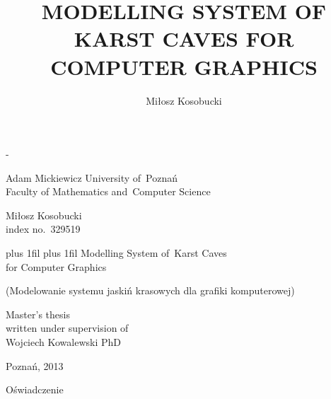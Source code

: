 \documentclass[twoside,openright,a4paper,12pt]{memoir}
\theoremstyle{definition}
\begin{document}
\title{MODELLING SYSTEM OF KARST CAVES FOR COMPUTER GRAPHICS}
\author{Miłosz Kosobucki}


\begin{titlingpage}
\calccentering{\unitlength}
\begin{adjustwidth*}{\unitlength}{-\unitlength}
\begin{center}
 \begin{LARGE}
   Adam Mickiewicz University of~Poznań\\
   Faculty of Mathematics and~Computer Science\\
   \vspace{2.5cm}
   \begin{huge}
     Miłosz Kosobucki\\
     \small{index no.~329519}\\
   \end{huge}
   \vspace{2.5cm}
   \begin{Huge}
     \leftskip=-3cm plus 1fil\rightskip=-3cm plus 1fil
     Modelling System of~Karst Caves\\ for Computer Graphics\\
   \end{Huge}
   \vspace{0.3cm}
   \begin{footnotesize}
     (Modelowanie systemu jaskiń krasowych dla grafiki komputerowej)
   \end{footnotesize}
   \vspace{2.3cm}
    \begin{flushleft}
      \hsize
      \large
      Master's thesis\\
      written under supervision of\\
      Wojciech Kowalewski PhD\\
    \end{flushleft}
    \vspace{2.5cm}
    Poznań, 2013
 \end{LARGE}
\end{center}
\end{adjustwidth*}
\end{titlingpage}

\listoftodos

\begin{center}
  \LARGE{Oświadczenie}
\end{center}
\end{document}
